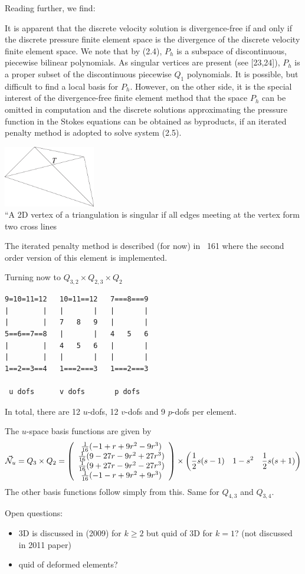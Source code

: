 Reading further, we find:
\begin{displayquote}
{\color{darkgray}
It is apparent that the discrete velocity solution is divergence-free if and only if the
discrete pressure ﬁnite element space is the divergence of the discrete velocity
ﬁnite element space.
We note that by (2.4), $P_h$ is a subspace of discontinuous, piecewise bilinear
polynomials. As singular vertices are present (see [23,24]), $P_h$ is a proper subset
of the discontinuous piecewise $Q_1$ polynomials. It is possible, but difficult to
ﬁnd a local basis for $P_h$. However, on the other side, it is the special interest
of the divergence-free ﬁnite element method that the space $P_h$ can be omitted
in computation and the discrete solutions approximating the pressure function
in the Stokes equations can be obtained as byproducts, if an iterated penalty
method is adopted to solve system (2.5).
}
\end{displayquote}

\begin{center}
\includegraphics[width=4cm]{images/pair_qqq/singular}\\
{\captionfont ``A 2D vertex
of a triangulation is singular if all edges meeting at the vertex form two cross 
lines \cite{zhan11a}}
\end{center}

The iterated penalty method is described (for now) in \stone~161 where the 
second order version of this element is implemented.




Turning now to $Q_{3,2}\times Q_{2,3}\times Q_{2}$
\begin{verbatim}
9=10=11=12   10=11==12   7===8===9
|        |   |       |   |       |
|        |   7   8   9   |       |
5==6==7==8   |       |   4   5   6
|        |   4   5   6   |       |
|        |   |       |   |       |
1==2==3==4   1===2===3   1===2===3

 u dofs      v dofs       p dofs

\end{verbatim}
In total, there are 12 $u$-dofs, 12 $v$-dofs and 9 $p$-dofs per element.

The $u$-space basis functions are given by 
\[
\vec{{\mathcal{N}}}_u = Q_3 \times Q_2 =
\left(
\begin{array}{c}
\frac{1}{16} (-1+  r+9r^2- 9r^3 ) \\
\frac{1}{16} ( 9-27r-9r^2+27r^3 ) \\
\frac{1}{16} ( 9+27r-9r^2-27r^3 ) \\
\frac{1}{16} (-1-  r+9r^2+ 9r^3 ) 
\end{array}
\right)
\times
\left(
\frac12 s(s-1)  \quad
1-s^2 \quad
\frac12 s(s+1)
\right)
\]
The other basis functions follow simply from this. Same for $Q_{4,3}$ and $Q_{3,4}$.


Open questions:
\begin{itemize}
\item 3D is discussed in \cite{zhan09} (2009) for $k\ge 2$ but quid of 3D for $k=1$? (not discussed in 2011 paper) 
\item quid of deformed elements?
\end{itemize}




